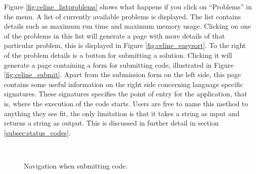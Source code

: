 Figure \ref{fig:celine_listproblems} shows what happens if you click on ``Problems'' in the menu. A list of currently available problems is displayed. The list contains details such as maximum run time and maximum memory usage. Clicking on one of the problems in this list will generate a page with more details of that particular problem, this is displayed in Figure \ref{fig:celine_easysort}. To the right of the problem details is a button for submitting a solution. Clicking it will generate a page containing a form for submitting code, illustrated in Figure \ref{fig:celine_submit}. Apart from the submission form on the left side, this page contains some useful information on the right side concerning language specific signatures. These signatures specifies the point of entry for the application, that is, where the execution of the code starts. Users are free to name this method to anything they see fit, the only limitation is that it takes a string as input and returns a string as output. This is discussed in further detail in section \ref{subsec:status_codes}.

\begin{figure}[h]
\centering
\mbox{
}
\caption{Navigation when submitting code.}
\label{fig:celine_split_submit_submissions}
\end{figure}

